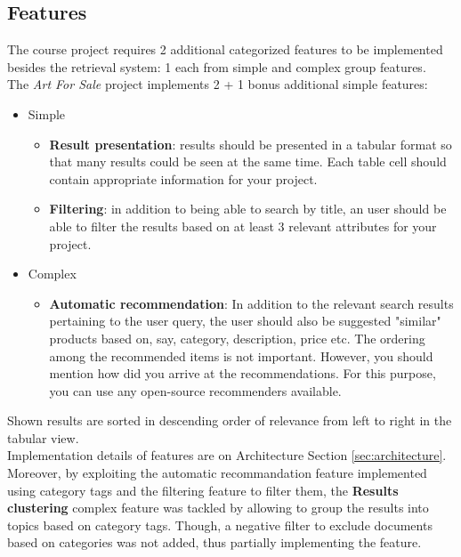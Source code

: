 \documentclass[12pt]{spieman}  %
\begin{document}
\begin{spacing}{1}
    \subsection{Features}
    The course project requires 2 additional categorized features to be implemented besides the retrieval system:
    1 each from simple and complex group features.\\
    The \textit{Art For Sale} project implements 2 + 1 bonus additional simple features:

    \begin{itemize}
        \item Simple
              \begin{itemize}
                  \item \textbf{Result presentation}:
                        results should be presented in a tabular format so that many results could be seen at the same time.
                        Each table cell should contain appropriate information for your project.
                  \item \textbf{Filtering}:
                        in addition to being able to search by title, an user should be able to filter the
                        results based on at least 3 relevant attributes for your project.
              \end{itemize}

        \item Complex
              \begin{itemize}
                  \item \textbf{Automatic recommendation}:
                        In addition to the relevant search results pertaining to the user query,
                        the user should also be suggested "similar" products based on, say, category, description,
                        price etc. The ordering among the recommended items is not important.
                        However, you should mention how did you arrive at the recommendations.
                        For this purpose, you can use any open-source recommenders available.
              \end{itemize}
    \end{itemize}

    Shown results are sorted in descending order of relevance from left to right in the tabular view.\\
    Implementation details of features are on Architecture Section \ref{sec:architecture}.\\
    Moreover, by exploiting the automatic recommandation feature implemented using category tags
    and the filtering feature to filter them,
    the \textbf{Results clustering} complex feature was tackled by allowing to
    group the results into topics based on category tags.
    Though, a negative filter to exclude documents based on categories was not added,
    thus partially implementing the feature.\\


\end{spacing}
\end{document}
